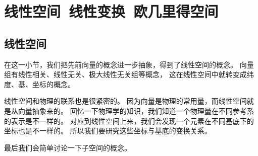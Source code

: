 \chapter{线性空间\ 线性变换\ 欧几里得空间}

\section{线性空间}
在这一小节，我们把先前向量的概念进一步抽象，得到了线性空间的概念。
向量组有线性相关、线性无关、极大线性无关组等概念，
这在线性空间中就转变成纬度、基、坐标的概念。

线性空间和物理的联系也是很紧密的。
因为向量是物理的常用量，而线性空间就是从向量抽象来的。
回忆一下物理学的知识，我们知道一个物理量在不同参考系的表示是不一样的。
对应到线性空间上来，我们会发现一个元素在不同基底下的坐标也是不一样的。
所以我们要研究这些坐标与基底的变换关系。

最后我们会简单讨论一下子空间的概念。


